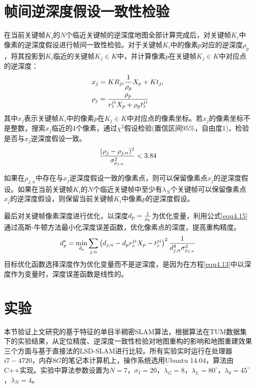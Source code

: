 \section{帧间逆深度假设一致性检验}
在当前关键帧$K_i$的$N$个临近关键帧的逆深度地图全部计算完成后，对关键帧$K_i$中像素的逆深度假设进行帧间一致性检验。对于关键帧$K_i$中的像素$p$对应的逆深度$\rho_p$，将其投影到$K_i$临近的关键帧$K_j \in K$中，并计算像素$p$在关键帧$K_j \in K$中对应点的逆深度：
\begin{equation}
\label{equ4.13}
\begin{aligned}
& x_j = K R_{ji} {1 \over \rho_p} X_p + Kt_{ji} \\ 
& \rho_j = { \rho_p \over r_z^{ji}X_p+\rho_p t_z^{ji} }
\end{aligned}
\end{equation}
其中$x_{j}$表示关键帧$K_i$中的像素$p$在$K_j \in K$中对应点的像素坐标。若$x_j$的像素坐标不是整数，搜索$x_{j}$临近的4个像素，通过$\chi^2$假设检验(置信区间$95\%$，自由度$1$)，检验是否与$x_j$逆深度假设一致。
\begin{equation}
\label{equ4.14}
{ (\rho_j - \rho_{j,n})^2 \over \sigma_{\rho_{j,n}}^2 } < 3.84
\end{equation}

如果在$\rho_{j,n}$中存在与$x_j$逆深度假设一致的像素点，则可以保留像素点$x_j$的逆深度假设。如果在当前关键帧$K_i$的$N$个临近关键帧中至少有$\lambda_N$个关键帧可以保留像素点$x_j$的逆深度假设，则保留当前关键帧$K_i$中像素$p$的逆深度假设。

最后对关键帧像素深度进行优化，以深度$d_p = { 1 \over \rho_p }$为优化变量，利用公式\eqref{equ4.15}通过高斯-牛顿方法最小化深度误差函数，优化像素点的深度，提高重构精度。
\begin{equation}
\label{equ4.15}
d_p^* = \min_{d_p} \sum\limits_{j,n} \left( d_{j,n} - d_p r_z^{ji} X_p - t_z^{ji}  \right)^2  {1 \over {d_{j,n}^4 \sigma_{\rho_{j,n}}^2 }}
\end{equation}
目标优化函数选择深度作为优化变量而不是逆深度，是因为在方程\eqref{equ4.13}中以深度作为变量时，深度误差函数是线性的。


\section{实验}
本节验证上文研究的基于特征的单目半稠密SLAM算法，根据算法在TUM数据集下的实验结果，从定位精度、逆深度一致性检验对地图重构的影响和地图重建效果三个方面与基于直接法的LSD-SLAM进行比较。所有实验实时运行在处理器$i7-4720$，内存$8G$的笔记本计算机上，操作系统选用Ubuntu 14.04，算法由C++实现。实验中算法参数设置为$N=7$，$\sigma_I=20$，$\lambda_G=8$，$\lambda_L = 80^\circ$，$\lambda_\theta=45^\circ$，$\lambda_N=4$。

